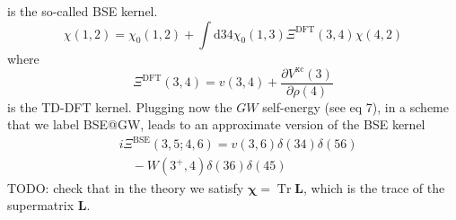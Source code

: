 is the so-called BSE kernel. 
$$
\chi(1,2)=\chi_0(1,2)+\int \mathrm{d} 34 \chi_0(1,3) \Xi^{\mathrm{DFT}}(3,4) \chi(4,2)
$$
where
$$
\Xi^{\mathrm{DFT}}(3,4)=v(3,4)+\frac{\partial V^{\mathrm{xc}}(3)}{\partial \rho(4)}
$$
is the TD-DFT kernel. Plugging now the $G W$ self-energy (see eq 7), in a scheme that we label BSE@GW, leads to an approximate version of the BSE kernel
$$
\begin{aligned}
& i \Xi^{\mathrm{BSE}}(3,5 ; 4,6)=v(3,6) \delta(34) \delta(56) \\
& \quad-W\left(3^{+}, 4\right) \delta(36) \delta(45)
\end{aligned}
$$
TODO: check that in the theory we satisfy $\bm{\chi} = \operatorname{Tr}\bm{L}$, which is the trace of the supermatrix $\bm{L}$.
    
